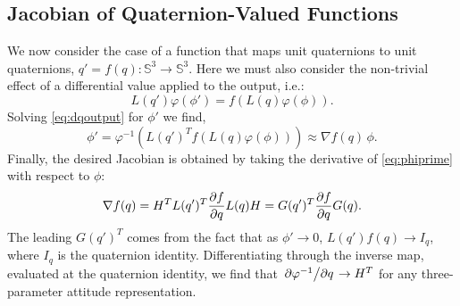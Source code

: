\documentclass[letterpaper, 10 pt, conference]{ieeeconf}  %
\newcommand{\Q}{\mathbb{S}^3}
\begin{document}
    \subsection{Jacobian of Quaternion-Valued Functions}
        We now consider the case of a function that maps unit quaternions to unit
        quaternions, $q' = f(q) : \Q \to \Q$. Here we must also consider the non-trivial
        effect of a differential value applied to the output, i.e.:
        \begin{equation} \label{eq:dqoutput}
            L(q') \varphi(\phi') = f(L(q)\varphi(\phi)) .
        \end{equation}
        Solving \eqref{eq:dqoutput} for $\phi'$ we find,
        \begin{equation} \label{eq:phiprime}
            \phi' = \varphi^{-1} \left( L(q')^T f(L(q)\varphi(\phi)) \right) \approx \nabla f(q) \, \phi.
        \end{equation}
        Finally, the desired Jacobian is obtained by taking the derivative of
        \eqref{eq:phiprime} with respect to $\phi$:
        \begin{equation} \label{eq:quat_jacobian}
            \nabla f(q) = H^T L(q')^T \pdv{f}{q} L(q) H = G(q')^T \pdv{f}{q} G(q).
        \end{equation}
        The leading $G(q')^T$ comes from the fact that as $\phi' \to 0$, $L(q') f(q) \to
        I_q$, where $I_q$ is the quaternion identity. Differentiating through the inverse
        map, evaluated at the quaternion identity, we find that $\pdv*{\varphi^{-1}}{q}
        \to H^T$ for any three-parameter attitude representation.
\end{document}
